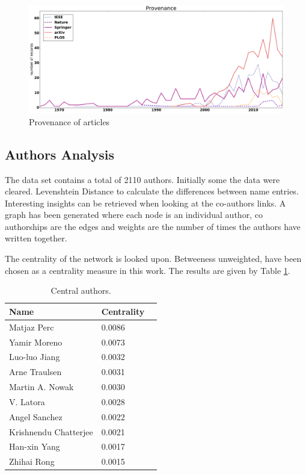 \documentclass{article}
\begin{document}
\begin{figure}[!hbtp]
    \centering
    \includegraphics[width=.8\textwidth]{./assets/images/provenance.pdf}
    \caption{Provenance of articles}
    \label{fig:provenance}
\end{figure}

\subsection{Authors Analysis}
The data set contains a total of 2110 authors. Initially some the data were cleared.
Levenshtein Distance to calculate the differences between name entries. 
Interesting insights can be retrieved when looking at the co-authors links.
A graph has been generated where each node is an individual author, 
co authorships are the edges and weights are the number of times the authors 
have written together. 

The centrality of the network is looked upon. Betweeness unweighted, have been 
chosen as a centrality measure in this work. The results are given by Table
\ref{table:central_authors}.

\begin{table}[!hbtp]
    \begin{center}
        \begin{tabular}{lll}
            \toprule
            Name & Centrality \\
            \midrule
            Matjaz Perc & 0.0086 \\
            Yamir Moreno & 0.0073 \\
            Luo-luo Jiang & 0.0032 \\
            Arne Traulsen & 0.0031 \\
            Martin A. Nowak & 0.0030 \\
            V. Latora & 0.0028 \\
            Angel Sanchez & 0.0022 \\
            Krishnendu Chatterjee & 0.0021 \\
            Han-xin Yang & 0.0017 \\
            Zhihai Rong & 0.0015 \\
            \bottomrule
        \end{tabular}
    \end{center}
    \caption{Central authors.}
    \label{table:central_authors}
\end{table}
\end{document}
